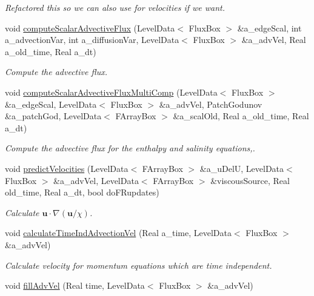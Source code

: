\begin{DoxyCompactItemize}
\begin{DoxyCompactList}\small\item\em Refactored this so we can also use for velocities if we want. \end{DoxyCompactList}\item 
void \hyperlink{class_a_m_r_level_mushy_layer_af3fc0d2c619ba6ad099b1ad6c39b352e}{compute\-Scalar\-Advective\-Flux} (Level\-Data$<$ Flux\-Box $>$ \&a\-\_\-edge\-Scal, int a\-\_\-advection\-Var, int a\-\_\-diffusion\-Var, Level\-Data$<$ Flux\-Box $>$ \&a\-\_\-adv\-Vel, Real a\-\_\-old\-\_\-time, Real a\-\_\-dt)
\begin{DoxyCompactList}\small\item\em Compute the advective flux. \end{DoxyCompactList}\item 
void \hyperlink{class_a_m_r_level_mushy_layer_a496393891a2db8a73b2f398f90324af5}{compute\-Scalar\-Advective\-Flux\-Multi\-Comp} (Level\-Data$<$ Flux\-Box $>$ \&a\-\_\-edge\-Scal, Level\-Data$<$ Flux\-Box $>$ \&a\-\_\-adv\-Vel, Patch\-Godunov \&a\-\_\-patch\-God, Level\-Data$<$ F\-Array\-Box $>$ \&a\-\_\-scal\-Old, Real a\-\_\-old\-\_\-time, Real a\-\_\-dt)
\begin{DoxyCompactList}\small\item\em Compute the advective flux for the enthalpy and salinity equations,. \end{DoxyCompactList}\item 
\hypertarget{class_a_m_r_level_mushy_layer_ab3565edc2fa5413b5ef6a6488494fe75}{void \hyperlink{class_a_m_r_level_mushy_layer_ab3565edc2fa5413b5ef6a6488494fe75}{predict\-Velocities} (Level\-Data$<$ F\-Array\-Box $>$ \&a\-\_\-u\-Del\-U, Level\-Data$<$ Flux\-Box $>$ \&a\-\_\-adv\-Vel, Level\-Data$<$ F\-Array\-Box $>$ \&viscous\-Source, Real old\-\_\-time, Real a\-\_\-dt, bool do\-F\-Rupdates)}\label{class_a_m_r_level_mushy_layer_ab3565edc2fa5413b5ef6a6488494fe75}

\begin{DoxyCompactList}\small\item\em Calculate $ \mathbf{u} \cdot \nabla \left( \mathbf{u}/\chi \right) $. \end{DoxyCompactList}\item 
void \hyperlink{class_a_m_r_level_mushy_layer_a0169d83decd5824058e36a4b126f762a}{calculate\-Time\-Ind\-Advection\-Vel} (Real a\-\_\-time, Level\-Data$<$ Flux\-Box $>$ \&a\-\_\-adv\-Vel)
\begin{DoxyCompactList}\small\item\em Calculate velocity for momentum equations which are time independent. \end{DoxyCompactList}\item 
\hypertarget{class_a_m_r_level_mushy_layer_ac2c8316afa057d4697ed7f7a5b8435b2}{void \hyperlink{class_a_m_r_level_mushy_layer_ac2c8316afa057d4697ed7f7a5b8435b2}{fill\-Adv\-Vel} (Real time, Level\-Data$<$ Flux\-Box $>$ \&a\-\_\-adv\-Vel)}\label{class_a_m_r_level_mushy_layer_ac2c8316afa057d4697ed7f7a5b8435b2}


\end{DoxyCompactItemize}
